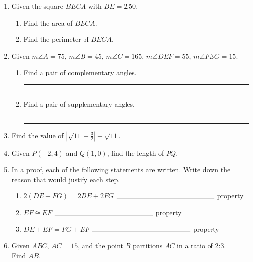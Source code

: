 \documentclass[12pt, oneside]{article}
\begin{document}
\begin{enumerate}
  \item Given the square $BECA$ with $BE=2.50$.
    \begin{enumerate}
      \item Find the area of $BECA$. \vspace{2cm}
      \item Find the perimeter of $BECA$. \vspace{2cm}
    \end{enumerate}

  \item Given $m \angle A=75$, $m \angle B=45$, $m \angle C=165$, $m \angle DEF=55$, $m \angle FEG=15$. \bigskip
    \begin{enumerate}
      \item Find a pair of complementary angles. \rule{3cm}{0.15mm} \hspace{1cm} \rule{3cm}{0.15mm} \bigskip
      \item Find a pair of supplementary angles. \rule{3cm}{0.15mm} \hspace{1cm} \rule{3cm}{0.15mm} \bigskip
    \end{enumerate}

\newpage
  \item Find the value of $|\sqrt{11}-\frac{3}{2}|-\sqrt{11}$. \vspace{4cm}

  \item Given $P(-2,4)$ and $Q(1,0)$, find the length of $\overline{PQ}$.
      \vspace{5cm}

  \item In a proof, each of the following statements are written. Write down the reason that would justify each step. \bigskip
    \begin{enumerate}
      \item $2(DE + FG)=2DE+2FG$  \hspace{0.6cm} $\rule{5cm}{0.15mm}$ property \bigskip
      \item $\overline{EF} \cong \overline{EF}$ \hspace{4cm} $\rule{5cm}{0.15mm}$ property \bigskip
      \item $DE+EF= FG+EF$  \hspace{1.7cm} $\rule{5cm}{0.15mm}$ property
    \end{enumerate}

  \item Given $\overline{ABC}$, $AC=15$, and the point $B$ partitions $\overline{AC}$ in a ratio of 2:3.\\[0.5cm] Find ${AB}$. \\[1.5cm]
       \vspace{3cm}


\end{enumerate}
\end{document}
